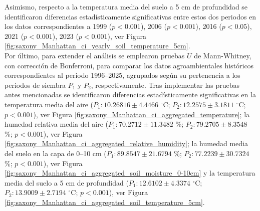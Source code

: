 Asimismo, respecto a la temperatura media del suelo a 5 cm de profundidad se identificaron diferencias estadísticamente significativas entre estos dos periodos en los datos correspondientes a 1999	($p<0.001$), 2006	($p<0.001$), 2016	($p<0.05$), 2021	($p<0.001$), 2023	($p<0.001$), ver Figura \ref{fig:saxony_Manhattan_ci_yearly_soil_temperature_5cm}.\\

Por último, para extender el análisis se emplearon pruebas $U$ de Mann-Whitney, con corrección de Bonferroni, para comparar los datos agroambientales históricos correspondientes al periodo 1996--2025, agrupados según su pertenencia a los periodos de siembra $P_1$ y $P_2$, respectivamente.  Tras implementar las pruebas antes mencionadas se identificaron diferencias estadísticamente significativas en la temperatura media del aire ($P_1:	10.26816	\pm	4.4466	$ $^\circ$C; 	$P_2:	12.2575	\pm	3.1811	$ $^\circ$C; 	$p<0.001$), ver Figura \ref{fig:saxony_Manhattan_ci_aggregated_temperature}; la humedad relativa media del aire ($P_1:	70.2712	\pm	11.3482	$ \%; 	$P_2:	79.2705	\pm	8.3548	$ \%; 	$p<0.001$), ver Figura \ref{fig:saxony_Manhattan_ci_aggregated_relative_humidity}; la humedad media del suelo en la capa de 0--10 cm ($P_1:	89.8547	\pm	21.6794	$ \%; 	$P_2:	77.2239	\pm	30.7324	$ \%; 	$p<0.001$), ver Figura \ref{fig:saxony_Manhattan_ci_aggregated_soil_moisture_0-10cm} y la temperatura media del suelo a 5 cm de profundidad ($P_1:	12.6102	\pm	4.3374	$ $^\circ$C; 	$P_2:	13.9009	\pm	2.7194	$ $^\circ$C; 	$p<0.001$), ver Figura \ref{fig:saxony_Manhattan_ci_aggregated_soil_temperature_5cm}.\\




